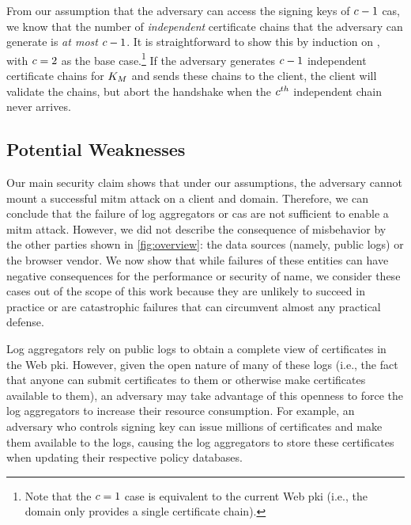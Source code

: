 
From our assumption that the adversary can access the signing keys
of $c - 1$ \acp{ca},
we know that the number of \emph{independent} certificate chains that the adversary can generate
is \emph{at most} $c - 1$. It is straightforward to show this by induction
on \policy, with $c = 2$ as the base case.\footnote{Note that the $c
= 1$ case is equivalent to the current Web \ac{pki} (i.e., the domain only
provides a single certificate chain).} If the adversary generates $c - 1$
independent certificate chains for $K_M$ and sends these chains to
the client, the client will validate the chains, but abort the handshake when
the $c^{th}$ independent chain never arrives.

\subsection{Potential Weaknesses}
\label{sec:analysis:weaknesses}

Our main security claim shows that under our assumptions, the adversary cannot
mount a successful \ac{mitm} attack on a client and domain. Therefore, we can
conclude that the failure of log aggregators or \acp{ca} are not sufficient to
enable a \ac{mitm} attack. However, we did not describe the consequence of
misbehavior by the other parties shown in \autoref{fig:overview}: the data
sources (namely, public logs) or the browser vendor. We now show that while
failures of these entities can have negative consequences for the performance or
security of \ac{name}, we consider these cases out of the scope of this work
because they are unlikely to succeed in practice or are catastrophic failures
that can circumvent almost any practical defense.

Log aggregators rely on public logs to obtain a complete view of certificates in
the Web \ac{pki}. However, given the open nature of many of these logs (i.e.,
the fact that anyone can submit certificates to them or otherwise make
certificates available to them), an adversary may take advantage of this
openness to force the log aggregators to increase their resource consumption.
For example, an adversary who controls  signing key can issue millions
of certificates and make them available to the logs, causing the log aggregators
to store these certificates when updating their respective policy databases.

